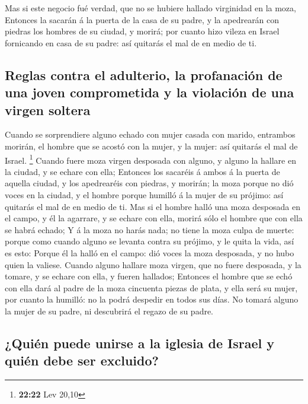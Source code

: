  Mas si este negocio fué verdad, que no se hubiere
hallado virginidad en la moza,  Entonces la sacarán á la
puerta de la casa de su padre, y la apedrearán con piedras los hombres
de su ciudad, y morirá; por cuanto hizo vileza en Israel fornicando en
casa de su padre: así quitarás el mal de en medio de ti.

\hypertarget{reglas-contra-el-adulterio-la-profanaciuxf3n-de-una-joven-comprometida-y-la-violaciuxf3n-de-una-virgen-soltera}{%
\subsection{Reglas contra el adulterio, la profanación de una joven
comprometida y la violación de una virgen
soltera}\label{reglas-contra-el-adulterio-la-profanaciuxf3n-de-una-joven-comprometida-y-la-violaciuxf3n-de-una-virgen-soltera}}

 Cuando se sorprendiere alguno echado con mujer casada
con marido, entrambos morirán, el hombre que se acostó con la mujer, y
la mujer: así quitarás el mal de Israel. \footnote{\textbf{22:22} Lev
  20,10}  Cuando fuere moza virgen desposada con alguno,
y alguno la hallare en la ciudad, y se echare con ella; 
Entonces los sacaréis á ambos á la puerta de aquella ciudad, y los
apedrearéis con piedras, y morirán; la moza porque no dió voces en la
ciudad, y el hombre porque humilló á la mujer de su prójimo: así
quitarás el mal de en medio de ti.  Mas si el hombre
halló una moza desposada en el campo, y él la agarrare, y se echare con
ella, morirá sólo el hombre que con ella se habrá echado;
 Y á la moza no harás nada; no tiene la moza culpa de
muerte: porque como cuando alguno se levanta contra su prójimo, y le
quita la vida, así es esto:  Porque él la halló en el
campo: dió voces la moza desposada, y no hubo quien la valiese.
 Cuando alguno hallare moza virgen, que no fuere
desposada, y la tomare, y se echare con ella, y fueren hallados;
 Entonces el hombre que se echó con ella dará al padre de
la moza cincuenta piezas de plata, y ella será su mujer, por cuanto la
humilló: no la podrá despedir en todos sus días.  No
tomará alguno la mujer de su padre, ni descubrirá el regazo de su padre.

\hypertarget{quiuxe9n-puede-unirse-a-la-iglesia-de-israel-y-quiuxe9n-debe-ser-excluido}{%
\subsection{¿Quién puede unirse a la iglesia de Israel y quién debe ser
excluido?}\label{quiuxe9n-puede-unirse-a-la-iglesia-de-israel-y-quiuxe9n-debe-ser-excluido}}

